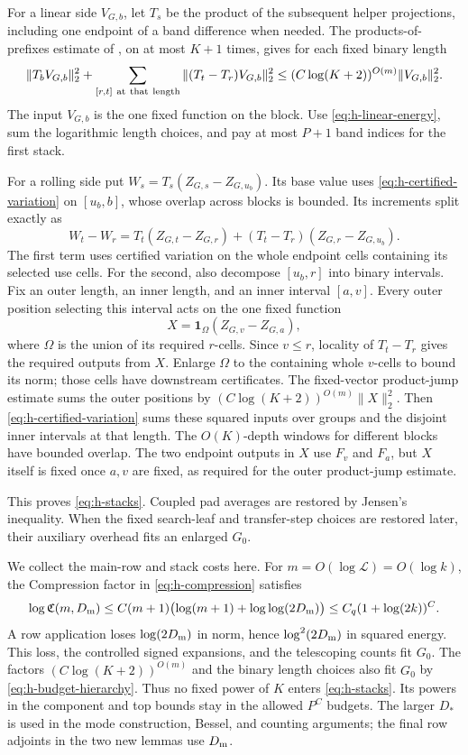 For a linear side \(V_{G,b}\), let \(T_s\) be the product of
the subsequent helper projections, including one endpoint of
a band difference when needed.  The products-of-prefixes
estimate of \cite[Section~3]{H}, on at most \(K+1\) times, gives
for each fixed binary length
\[
 \|T_bV_{G,b}\|_2^2+
 \sum_{[r,t]\ {\rm at\ that\ length}}
       \|(T_t-T_r)V_{G,b}\|_2^2
 \le (C\log(K+2))^{O(m)}\|V_{G,b}\|_2^2.
\]
The input \(V_{G,b}\) is the one fixed function on the block.
Use \eqref{eq:h-linear-energy}, sum the logarithmic length
choices, and pay at most \(P+1\) band indices for the first
stack.

For a rolling side put \(W_s=T_s(Z_{G,s}-Z_{G,u_b})\).
Its base value uses \eqref{eq:h-certified-variation} on
\([u_b,b]\), whose overlap across blocks is bounded.  Its
increments split exactly as
\[
 W_t-W_r=T_t(Z_{G,t}-Z_{G,r})
             +(T_t-T_r)(Z_{G,r}-Z_{G,u_b}).
\]
The first term uses certified variation on the whole endpoint
cells containing its selected use cells.  For the second, also
decompose \([u_b,r]\) into binary intervals.  Fix an outer
length, an inner length, and an inner interval \([a,v]\).
Every outer position selecting this interval acts on the one
fixed function
\[
 X=\mathbf1_\Omega(Z_{G,v}-Z_{G,a}),
\]
where \(\Omega\) is the union of its required \(r\)-cells.
Since \(v\le r\), locality of \(T_t-T_r\) gives the required
outputs from \(X\).  Enlarge \(\Omega\) to the containing whole
\(v\)-cells to bound its norm; those cells have downstream
certificates.  The fixed-vector product-jump estimate sums the
outer positions by
\((C\log(K+2))^{O(m)}\|X\|_2^2\).  Then
\eqref{eq:h-certified-variation} sums these squared inputs over
groups and the disjoint inner intervals at that length.  The
\(O(K)\)-depth windows for different blocks have bounded
overlap.  The two endpoint outputs in \(X\) use \(F_v\) and
\(F_a\), but \(X\) itself is fixed once \(a,v\) are fixed, as
required for the outer product-jump estimate.

This proves \eqref{eq:h-stacks}.  Coupled pad averages are restored
by Jensen's inequality.  When the fixed search-leaf and transfer-step
choices are restored later, their auxiliary overhead fits an enlarged
\(G_0\).

We collect the main-row and stack costs here.  For
\(m=O(\log\mathcal L)=O(\log k)\), the Compression factor in
\eqref{eq:h-compression} satisfies
\[
 \log\mathfrak C(m,D_{\rm m})
 \le C(m+1)\bigl(\log(m+1)+\log\log(2D_{\rm m})\bigr)
 \le C_q(1+\log(2k))^C.
\]
A row application loses \(\log(2D_{\rm m})\) in norm, hence
\(\log^2(2D_{\rm m})\) in squared energy.  This loss, the
controlled signed expansions, and the telescoping counts fit
\(G_0\).  The factors \((C\log(K+2))^{O(m)}\) and the binary
length choices also fit \(G_0\) by
\eqref{eq:h-budget-hierarchy}.  Thus no fixed power of \(K\)
enters \eqref{eq:h-stacks}.  Its powers in the component and
top bounds stay in the allowed \(P^C\) budgets.  The larger
\(D_*\) is used in the mode construction, Bessel, and counting arguments;
the final row adjoints in the two new lemmas use \(D_{\rm m}\).

